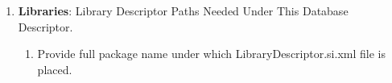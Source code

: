 \begin{enumerate}
\begin{enumerate}
\begin{center}
{{\begin{enumerate}
						\end{enumerate}

					\vspace*{0.0cm} %
				}
			}

			\end{center}
		\end{enumerate}

	\item \small \textbf{Libraries}: Library Descriptor Paths Needed Under This Database Descriptor.

		\begin{enumerate}

			\item \small Provide full package name under which LibraryDescriptor.si.xml file is placed.

		\end{enumerate}


\end{enumerate}

